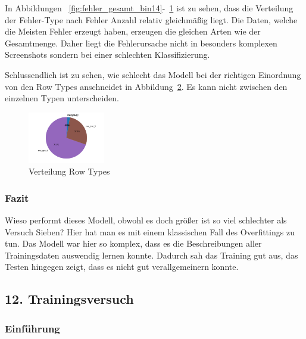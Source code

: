 \documentclass[pdftex,a4paper,halfparskip, article]{scrartcl}
\begin{document}
\begin{figure}
\begin{minipage}{.33\textwidth}
  \label{fig:fehler_schlechteste20_bin14}
\end{minipage}
\end{figure}

In Abbildungen ~\ref{fig:fehler_gesamt_bin14}-~\ref{fig:fehler_schlechteste20_bin14} ist zu sehen, dass die Verteilung der Fehler-Type nach Fehler Anzahl relativ gleichmäßig liegt. Die Daten, welche die Meisten Fehler erzeugt haben, erzeugen die gleichen Arten wie der Gesamtmenge. Daher liegt die Fehlerursache nicht in besonders komplexen Screenshots sondern bei einer schlechten Klassifizierung.

Schlussendlich ist zu sehen, wie schlecht das Modell bei der richtigen Einordnung von den Row Types anschneidet in Abbildung~\ref{fig:bin14_row_type}. Es kann nicht zwischen den einzelnen Typen unterscheiden.


\begin{figure}[h]
\centering
\includegraphics[width=0.3\textwidth]{predictions_bin14_predicted_row_type_distribution}
\caption{Verteilung Row Types}
\label{fig:bin14_row_type}
\end{figure}


\subsubsection*{Fazit}

Wieso performt dieses Modell, obwohl es doch größer ist so viel schlechter als Versuch Sieben? Hier hat man es mit einem klassischen Fall des Overfittings zu tun. Das Modell war hier so komplex, dass es die Beschreibungen aller Trainingsdaten auswendig lernen konnte. Dadurch sah das Training gut aus, das Testen hingegen zeigt, dass es nicht gut verallgemeinern konnte.


\subsection{12. Trainingsversuch}
\subsubsection*{Einführung}
\end{document}
